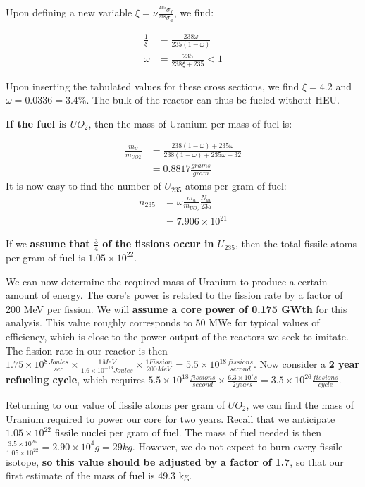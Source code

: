 \documentclass[12pt]{article}
\begin{document}
Upon defining a new variable $\xi = \nu \frac{^{235} \sigma_f}{^{238} \sigma_a}$, we find:

\begin{align}
\frac{1}{\xi} &= \frac{238 \omega}{235 (1 - \omega)} \\
\omega &= \frac{235}{238 \xi + 235} < 1
\end{align} 

Upon inserting the tabulated values for these cross sections, we find $\xi = 4.2$ and $\omega = 0.0336 = 3.4 \% $. The bulk of the reactor can thus be fueled without HEU.

\textbf{If the fuel is $UO_2$}, then the mass of Uranium per mass of fuel is:

\begin{align}
\frac{m_U}{m_{UO2}} &= \frac{238 (1 - \omega) + 235 \omega}{238 (1 - \omega) + 235 \omega + 32} \\
 &= 0.8817 \frac{grams}{gram}
\end{align}
It is now easy to find the number of $U_{235}$ atoms per gram of fuel:
\begin{align}
n_{235} &= \omega \frac{m_u}{m_{UO_2}} \frac{N_{av}}{235} \\
 &= 7.906 \times 10^{21}
\end{align}

If we \textbf{assume that $\frac{3}{4}$ of the fissions occur in $U_{235}$}, then the total fissile atoms per gram of fuel is $1.05 \times 10^{22}$. 

We can now determine the required mass of Uranium to produce a certain amount of energy. The core's power is related to the fission rate by a factor of 200 MeV per fission. We will \textbf{assume a core power of 0.175 GWth} for this analysis. This value roughly corresponds to 50 MWe for typical values of efficiency, which is close to the power output of the reactors we seek to imitate. The fission rate in our reactor is then $1.75 \times 10^8 \frac{Joules}{sec} \times \frac{1 MeV}{1.6 \times 10^{-13} Joules} \times \frac{1 Fission}{200 MeV} = 5.5 \times 10^{18} \frac{fissions}{second}$. Now consider a \textbf{2 year refueling cycle}, which requires $5.5 \times 10^{18} \frac{fissions}{second} \times \frac{6.3 \times 10^7 s}{2 years} = 3.5 \times 10^{26} \frac{fissions}{cycle}$.

Returning to our value of fissile atoms per gram of $UO_2$, we can find the mass of Uranium required to power our core for two years. Recall that we anticipate $1.05 \times 10^{22}$ fissile nuclei per gram of fuel. The mass of fuel needed is then $\frac{3.5 \times 10 ^{26}}{1.05 \times 10^{22}} = 2.90 \times 10^{4} g = 29 kg$. However, we do not expect to burn every fissile isotope, \textbf{so this value should be adjusted by a factor of 1.7}, so that our first estimate of the mass of fuel is 49.3 kg. 
\end{document}
